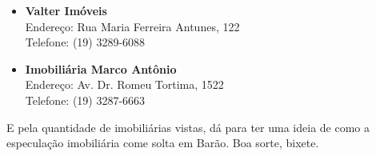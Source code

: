 \begin{itemize}
    \item   \textbf{Valter Imóveis}
        \\Endereço: Rua Maria Ferreira Antunes, 122
        \\Telefone: (19) 3289-6088

    \item   \textbf{Imobiliária Marco Antônio}
        \\Endereço: Av. Dr. Romeu Tortima, 1522
        \\Telefone: (19) 3287-6663

\end{itemize}

E pela quantidade de imobiliárias vistas, dá para ter uma ideia de como a
especulação imobiliária come solta em Barão. Boa sorte, bixete.
